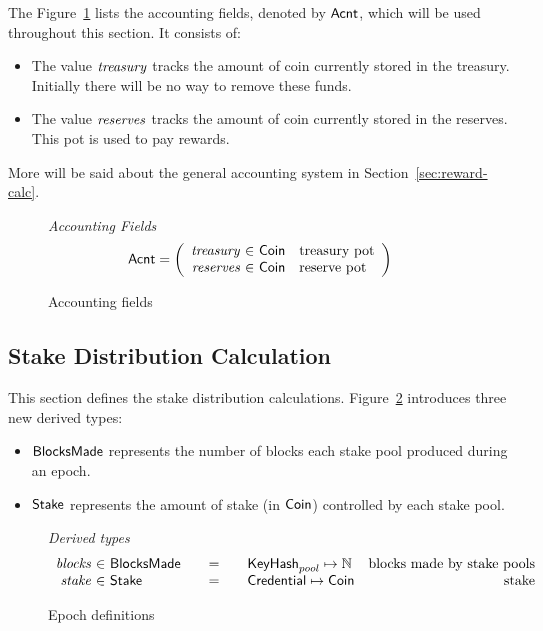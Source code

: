 The Figure~\ref{fig:defs:accounting} lists the accounting fields, denoted by $\mathsf{Acnt}$,
which will be used throughout this section. It consists of:
\begin{itemize}
  \item The value $\mathit{treasury}$ tracks the amount of coin currently stored in the treasury.
    Initially there will be no way to remove these funds.
  \item The value $\mathit{reserves}$ tracks the amount of coin currently stored in the reserves.
    This pot is used to pay rewards.
\end{itemize}
More will be said about the general accounting system in Section~\ref{sec:reward-calc}.

\begin{figure}[htb]
  \emph{Accounting Fields}
  \begin{equation*}
    \Acnt =
    \left(
      \begin{array}{r@{~\in~}ll}
        \var{treasury} & \Coin & \text{treasury pot}\\
        \var{reserves} & \Coin & \text{reserve pot}\\
      \end{array}
    \right)
  \end{equation*}
  \caption{Accounting fields}
  \label{fig:defs:accounting}
\end{figure}


\subsection{Stake Distribution Calculation}
\label{sec:stake-dist-calc}

This section defines the stake distribution calculations.
Figure~\ref{fig:epoch-defs} introduces three new derived types:
\begin{itemize}
  \item $\mathsf{BlocksMade}$ represents the number of blocks each stake pool produced
    during an epoch.
  \item $\mathsf{Stake}$ represents the amount of stake (in $\mathsf{Coin}$) controlled by each
    stake pool.
\end{itemize}

\begin{figure}[htb]
  \emph{Derived types}
  \begin{equation*}
    \begin{array}{r@{~\in~}l@{\qquad=\qquad}lr}
      \var{blocks}
      & \BlocksMade
      & \KeyHash_{pool} \mapsto \N
      & \text{blocks made by stake pools} \\
      \var{stake}
      & \Stake
      & \Credential \mapsto \Coin
      & \text{stake} \\
    \end{array}
  \end{equation*}
  \caption{Epoch definitions}
  \label{fig:epoch-defs}
\end{figure}

